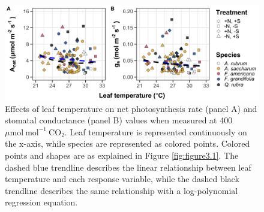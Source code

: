 \newpage
\begin{landscape}
    \begin{figure}
        \centering
        \includegraphics[scale = 0.07]{ch3_NxpH/figs/NxS_figS1_leaftemp.png}
        \caption[Effects of leaf temperature on net photosynthesis rate and stomatal conductance values when measured at 400 $\mu \mathrm{mol\ mol^{-1}\ CO_2}$]{Effects of leaf temperature on net photosynthesis rate (panel A) and stomatal conductance (panel B) values when measured at 400 $\mu \mathrm{mol\ mol^{-1}\ CO_2}$. Leaf temperature is represented continuously on the x-axis, while species are represented as colored points. Colored points and shapes are as explained in Figure \ref{fig:figure3.1}. The dashed blue trendline describes the linear relationship between leaf temperature and each response variable, while the dashed black trendline describes the same relationship with a log-polynomial regression equation.}
        \label{fig:figure.b1}
    \end{figure}
\end{landscape}
\clearpage

